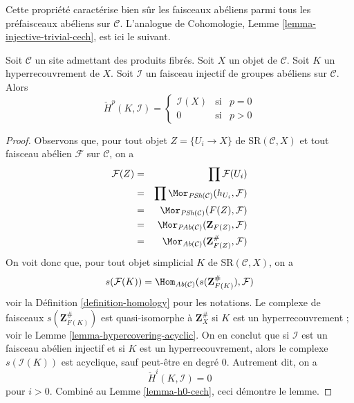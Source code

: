 \noindent
Cette propriété caractérise bien sûr les faisceaux abéliens parmi tous les
préfaisceaux abéliens sur $\mathcal{C}$.
L'analogue de Cohomologie, Lemme \ref{lemma-injective-trivial-cech},
est ici le suivant.

\begin{lemma}
\label{lemma-injective-trivial-cech}
Soit $\mathcal{C}$ un site admettant des produits fibrés.
Soit $X$ un objet de $\mathcal{C}$.
Soit $K$ un hyperrecouvrement de $X$.
Soit $\mathcal{I}$ un faisceau injectif de groupes abéliens sur $\mathcal{C}$.
Alors
$$
\check{H}^p(K, \mathcal{I}) =
\left\{
\begin{matrix}
\mathcal{I}(X) & \text{si} & p = 0 \\
0 & \text{si} & p > 0
\end{matrix}
\right.
$$
\end{lemma}

\begin{proof}
Observons que, pour tout objet $Z = \{U_i \to X\}$ de
$\text{SR}(\mathcal{C}, X)$ et tout faisceau abélien
$\mathcal{F}$ sur $\mathcal{C}$, on a
\begin{eqnarray*}
\mathcal{F}(Z)
& = &
\prod \mathcal{F}(U_i) \\
& = &
\prod \Mor_{\textit{PSh}(\mathcal{C})}(h_{U_i}, \mathcal{F})\\
& = &
\Mor_{\textit{PSh}(\mathcal{C})}(F(Z), \mathcal{F})\\
& = &
\Mor_{\textit{PAb}(\mathcal{C})}(\mathbf{Z}_{F(Z)}, \mathcal{F}) \\
& = &
\Mor_{\textit{Ab}(\mathcal{C})}(\mathbf{Z}_{F(Z)}^\#, \mathcal{F})
\end{eqnarray*}
On voit donc que, pour tout objet simplicial $K$ de
$\text{SR}(\mathcal{C}, X)$, on a
\begin{equation}
\label{equation-identify-cech}
s(\mathcal{F}(K))
=
\Hom_{\textit{Ab}(\mathcal{C})}(s(\mathbf{Z}_{F(K)}^\#), \mathcal{F})
\end{equation}
voir la Définition \ref{definition-homology} pour les notations.
Le complexe de faisceaux $s(\mathbf{Z}_{F(K)}^\#)$ est quasi-isomorphe
à $\mathbf{Z}_X^\#$ si $K$ est un hyperrecouvrement ; voir le
Lemme \ref{lemma-hypercovering-acyclic}. On en conclut
que si $\mathcal{I}$ est un faisceau abélien injectif et si
$K$ est un hyperrecouvrement, alors le complexe $s(\mathcal{I}(K))$
est acyclique, sauf peut-être en degré $0$.
Autrement dit, on a
$$
\check{H}^i(K, \mathcal{I}) = 0
$$
pour $i > 0$. Combiné au Lemme \ref{lemma-h0-cech}, ceci démontre le lemme.
\end{proof}

